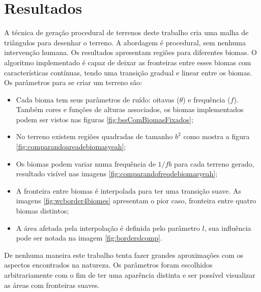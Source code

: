 \chapter{Resultados}
A técnica de geração procedural de terrenos deste trabalho cria uma 
malha de triângulos para desenhar o terreno. A abordagem é procedural, sem nenhuma 
intervenção humana. Os resultados apresentam regiões para diferentes biomas. O
algoritmo implementado é capaz de deixar as fronteiras entre esses biomas com características 
contínuas, tendo uma transição gradual e linear entre os biomas.
Os parâmetros para se criar um terreno são:
\begin{itemize}
    \item Cada bioma tem seus parâmetros de ruído: oitavas ($\theta$) e frequência ($f$). Também cores e funções de alturas associados, os
    biomas implementados podem ser vistos nas figuras \ref{fig:bssComBiomasFixados};
    \item No terreno existem regiões quadradas de tamanho $b^{2}$ como mostra a figura \ref{fig:comparandoareadebiomasyeah};
    \item Os biomas podem variar numa frequência de $1/fb$ para cada terreno
    gerado, resultado visível nas imagens \ref{fig:comparandofreqdebiomasyeah};
    \item A fronteira entre biomas é interpolada para ter uma transição suave. As imagens \ref{fig:wcborder4biomes}
    apresentam o pior caso, fronteira entre quatro biomas distintos;
    \item A área afetada pela interpolação é definida pelo parâmetro $l$, sua influência 
    pode ser notada na imagem \ref{fig:borderslcomp}.
\end{itemize}

De nenhuma maneira este trabalho tenta fazer grandes aproximações
com os aspectos encontrados na natureza. Os parâmetros foram escolhidos arbitrariamente 
com o fim de ter uma aparência distinta e ser possível visualizar as áreas com fronteiras suaves.

